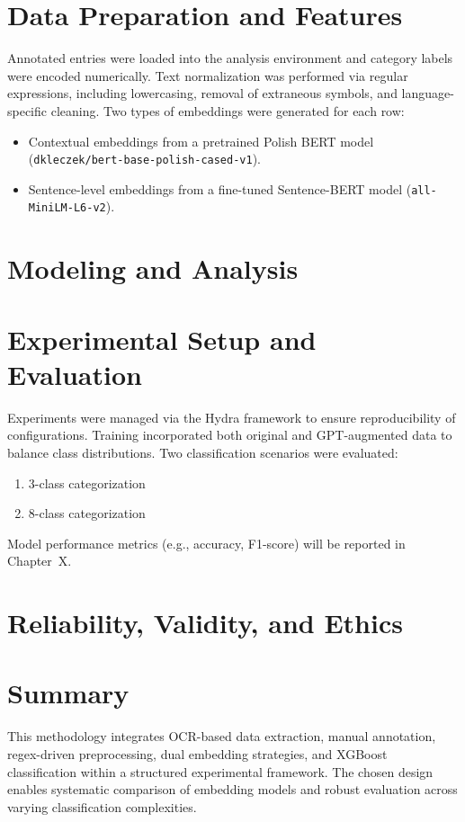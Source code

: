 \documentclass{SGGW-thesis-EN}
\begin{document}
\section{Data Preparation and Features}
Annotated entries were loaded into the analysis environment and category labels were encoded numerically. Text normalization was performed via regular expressions, including lowercasing, removal of extraneous symbols, and language-specific cleaning. Two types of embeddings were generated for each row:
\begin{itemize}
  \item Contextual embeddings from a pretrained Polish BERT model (\texttt{dkleczek/bert-base-polish-cased-v1}).
  \item Sentence-level embeddings from a fine-tuned Sentence-BERT model (\texttt{all-MiniLM-L6-v2}).
\end{itemize}

\section{Modeling and Analysis}


\section{Experimental Setup and Evaluation}
Experiments were managed via the Hydra framework to ensure reproducibility of configurations. Training incorporated both original and GPT-augmented data to balance class distributions. Two classification scenarios were evaluated:
\begin{enumerate}
  \item 3-class categorization  
  \item 8-class categorization  
\end{enumerate}
Model performance metrics (e.g., accuracy, F1-score) will be reported in Chapter~X.

\section{Reliability, Validity, and Ethics}


\section{Summary}
This methodology integrates OCR-based data extraction, manual annotation, regex-driven preprocessing, dual embedding strategies, and XGBoost classification within a structured experimental framework. The chosen design enables systematic comparison of embedding models and robust evaluation across varying classification complexities.
\end{document}
